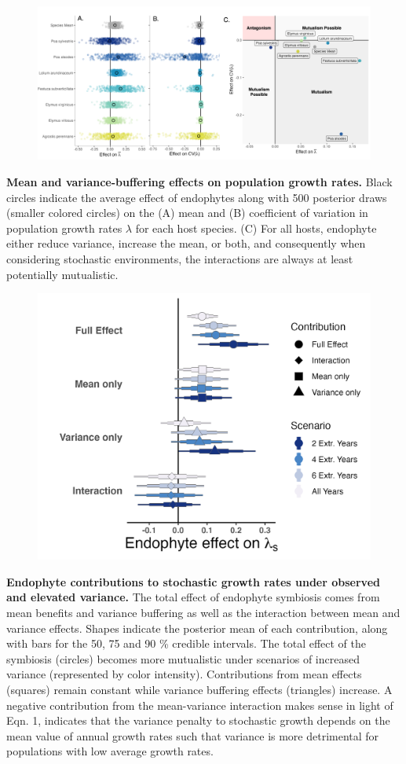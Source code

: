 \documentclass[12pt]{article}
\begin{document}
\begin{figure}
	\centering
	\includegraphics[width=\linewidth]{StochDemo_fig2.png}
\end{figure}
 \textbf{Mean and variance-buffering effects on population growth rates.} Black circles indicate the average effect of endophytes along with 500 posterior draws (smaller colored circles) on the (A) mean and (B) coefficient of variation in population growth rates $\lambda$ for each host species. (C) For all hosts, endophyte either reduce variance, increase the mean, or both, and consequently when considering stochastic environments, the interactions are always at least potentially mutualistic.
\newpage

\begin{figure}
	\centering
	\includegraphics[width=.8\linewidth]{StochDemo_fig3.png}
\end{figure}
 \textbf{Endophyte contributions to stochastic growth rates under observed and elevated variance.} The total effect of endophyte symbiosis comes from mean benefits and variance buffering as well as the interaction between mean and variance effects. Shapes indicate the posterior mean of each contribution, along with bars for the 50, 75 and 90 \% credible intervals.  The total effect of the symbiosis (circles) becomes more mutualistic under scenarios of increased variance (represented by color intensity). Contributions from mean effects (squares) remain constant while variance buffering effects (triangles) increase. A negative contribution from the mean-variance interaction makes sense in light of Eqn. 1, indicates that the variance penalty to stochastic growth depends on the mean value of annual growth rates such that variance is more detrimental for populations with low average growth rates.
\newpage
\end{document}
